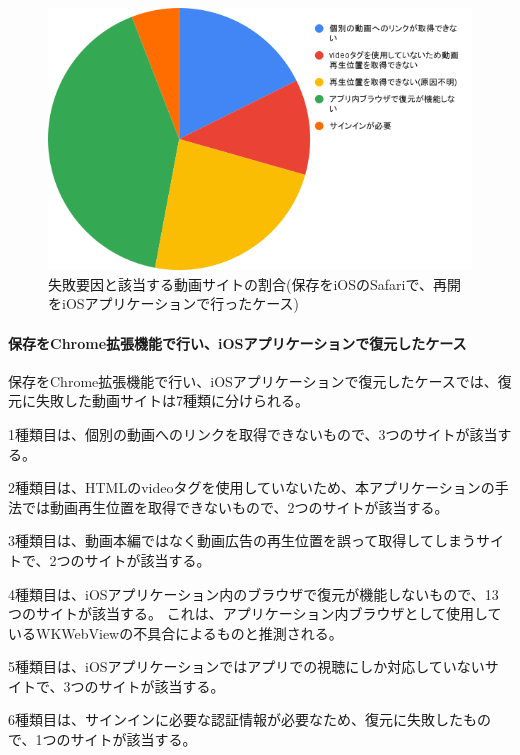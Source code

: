 \begin{figure}[htbp]
  \caption{失敗要因と該当する動画サイトの割合(保存をiOSのSafariで、再開をiOSアプリケーションで行ったケース)}
  \label{fig:evl-consideration-video-cause-ratio-ios}
  \begin{center}
    \includegraphics[bb=0 0 600 371,width=15cm]{img/060_evaluation/consideration/video/cause-ratio-ios.pdf}
  \end{center}
\end{figure}

\paragraph{保存をChrome拡張機能で行い、iOSアプリケーションで復元したケース}
保存をChrome拡張機能で行い、iOSアプリケーションで復元したケースでは、復元に失敗した動画サイトは7種類に分けられる。

1種類目は、個別の動画へのリンクを取得できないもので、3つのサイトが該当する。

2種類目は、HTMLのvideoタグを使用していないため、本アプリケーションの手法では動画再生位置を取得できないもので、2つのサイトが該当する。

3種類目は、動画本編ではなく動画広告の再生位置を誤って取得してしまうサイトで、2つのサイトが該当する。

4種類目は、iOSアプリケーション内のブラウザで復元が機能しないもので、13つのサイトが該当する。
これは、アプリケーション内ブラウザとして使用しているWKWebViewの不具合によるものと推測される。

5種類目は、iOSアプリケーションではアプリでの視聴にしか対応していないサイトで、3つのサイトが該当する。

6種類目は、サインインに必要な認証情報が必要なため、復元に失敗したもので、1つのサイトが該当する。

